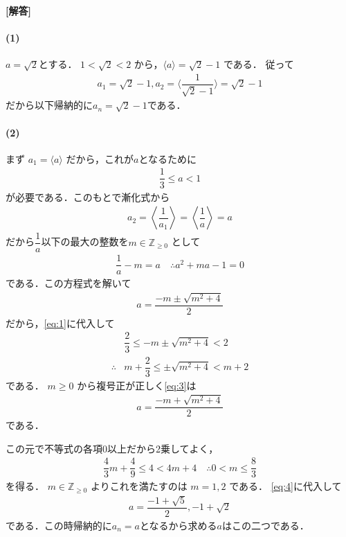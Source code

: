 \documentclass[../../main.tex]{subfiles}
\begin{document}
\begin{oframed}
  
\end{oframed}

{\bf [解答]}
\paragraph{(1)}

$a=\sqrt{2}$とする．
$1 < \sqrt{2} < 2$ から，$\langle a \rangle = \sqrt{2}-1$ である．
従って
\begin{align}
  a_1 = \sqrt{2}-1, a_2 = \langle \dfrac{1}{\sqrt{2}-1} \rangle = \sqrt{2}-1
\end{align}
だから以下帰納的に$a_n = \sqrt{2}-1$である．

\paragraph{(2)}

まず $a_1 = \langle a \rangle$ だから，これが$a$となるために
\begin{align}
  \dfrac{1}{3} \le a < 1 \label{eq:1}
\end{align}
が必要である．このもとで漸化式から
\begin{align}
  a_2 = \left\langle \dfrac{1}{a_1} \right\rangle = \left\langle \dfrac{1}{a} \right\rangle = a \label{eq:2}
\end{align}
だから$\dfrac{1}{a}$以下の最大の整数を$m \in \mathbb{Z}_{\ge 0}$ として
\begin{align}
  \dfrac{1}{a} - m = a \quad \therefore a^2 + ma - 1 = 0
\end{align}
である．この方程式を解いて
\begin{align}
  a = \dfrac{-m \pm \sqrt{m^2+4}}{2} \label{eq:3}
\end{align}
だから，\cref{eq:1}に代入して
\begin{align}
  & \dfrac{2}{3} \le -m \pm \sqrt{m^2+4} < 2 \\
  \therefore
  & m + \dfrac{2}{3} \le \pm \sqrt{m^2+4} < m + 2
\end{align}
である．
$m \ge 0$ から複号正が正しく\cref{eq:3}は
\begin{align}
  a = \dfrac{-m + \sqrt{m^2+4}}{2} \label{eq:4}
\end{align}
である．

この元で不等式の各項0以上だから2乗してよく，
\begin{align}
  \dfrac{4}{3} m + \dfrac{4}{9} \le 4 < 4m + 4
  \quad \therefore
  0 < m \le \dfrac{8}{3}
\end{align}
を得る．
$m \in \mathbb{Z}_{\ge 0}$ よりこれを満たすのは $m = 1, 2$ である．
\cref{eq:4}に代入して
\begin{align}
  a = \dfrac{-1+\sqrt{5}}{2}, -1+\sqrt{2}
\end{align}
である．この時帰納的に$a_n=a$となるから求める$a$はこの二つである．
\end{document}
